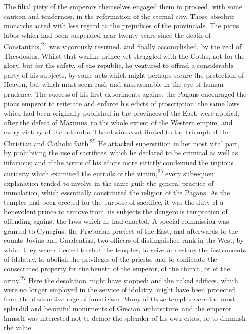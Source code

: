 The filial piety of the emperors themselves engaged them to
proceed, with some caution and tenderness, in the reformation of
the eternal city. Those absolute monarchs acted with less regard
to the prejudices of the provincials. The pious labor which had
been suspended near twenty years since the death of Constantius,\textsuperscript{24}
was vigorously resumed, and finally accomplished, by the zeal
of Theodosius. Whilst that warlike prince yet struggled with the
Goths, not for the glory, but for the safety, of the republic, he
ventured to offend a considerable party of his subjects, by some
acts which might perhaps secure the protection of Heaven, but
which must seem rash and unseasonable in the eye of human
prudence. The success of his first experiments against the Pagans
encouraged the pious emperor to reiterate and enforce his edicts
of proscription: the same laws which had been originally
published in the provinces of the East, were applied, after the
defeat of Maximus, to the whole extent of the Western empire; and
every victory of the orthodox Theodosius contributed to the
triumph of the Christian and Catholic faith.\textsuperscript{25} He attacked
superstition in her most vital part, by prohibiting the use of
sacrifices, which he declared to be criminal as well as infamous;
and if the terms of his edicts more strictly condemned the
impious curiosity which examined the entrails of the victim,\textsuperscript{26}
every subsequent explanation tended to involve in the same guilt
the general practice of immolation, which essentially constituted
the religion of the Pagans. As the temples had been erected for
the purpose of sacrifice, it was the duty of a benevolent prince
to remove from his subjects the dangerous temptation of offending
against the laws which he had enacted. A special commission was
granted to Cynegius, the Prætorian præfect of the East, and
afterwards to the counts Jovius and Gaudentius, two officers of
distinguished rank in the West; by which they were directed to
shut the temples, to seize or destroy the instruments of
idolatry, to abolish the privileges of the priests, and to
confiscate the consecrated property for the benefit of the
emperor, of the church, or of the army.\textsuperscript{27} Here the desolation
might have stopped: and the naked edifices, which were no longer
employed in the service of idolatry, might have been protected
from the destructive rage of fanaticism. Many of those temples
were the most splendid and beautiful monuments of Grecian
architecture; and the emperor himself was interested not to
deface the splendor of his own cities, or to diminish the value
